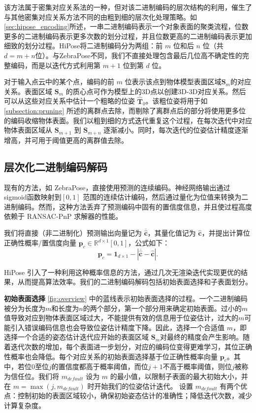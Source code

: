 该方法属于密集对应关系法的一种，但对该二进制编码的层次结构的利用，催生了与其他密集对应关系方法不同的由粗到细的层次化处理策略。如\autoref{sec:hipose_encoding}所述，一串二进制编码表示一个对象表面的聚类流程，位数更多的二进制编码表示更多次数的划分过程，并且位数更高的二进制编码表示更加细致的划分过程。HiPose将二进制编码分为两组：前 $m$ 位和后 $n$ 位（共$d=m+n$位）。与ZebraPose\cite{su2022zebrapose}不同，我们不直接处理包含最后几位高不确定性的完整编码，而是以迭代方式利用第 ${m+1}$ 位到第 $d$ 位。

对于输入点云中的某个点，编码的前 $m$ 位表示该点到物体模型表面区域$\mathbf{S}_{m}$的对应关系。表面区域 $\mathbf{S}_{m}$ 的质心点可作为模型上的3D点以创建3D-3D对应关系。然后可以从这些对应关系中估计一个粗略的位姿 $\hat{\mathbf{T}}_{0}$。该粗位姿将用于如\autoref{subsection:pruning} 所述的离群点去除，而剔除了离群点后的部分将使用更多位的编码收缩物体表面。我们以粗到细的方式迭代重复这个过程，在每次迭代中对应物体表面区域从 $\mathbf{S}_{m+1}$ 到 $\mathbf{S}_{m+n}$ 逐渐减小。同时，每次迭代的位姿估计精度逐渐增高，并可用于阈值更高的离群值去除。

\subsection{层次化二进制编码解码}
\label{subsection:solver}
现有的方法，如 ZebraPose\cite{su2022zebrapose}，直接使用预测的连续编码。神经网络输出通过sigmoid函数映射到$[0,1]$ 范围的连续估计编码，然后通过量化为位值来转换为二进制编码。然而，这种方法丢弃了预测编码中固有的置信度信息，并且使过程高度依赖于 RANSAC-PnP 求解器的性能。

我们将直接（非二进制化）预测输出向量记为 $\overline{\hat{\mathbf{c}}}$，其量化值记为 $\hat{\mathbf{c}}$，并提出计算位正确性概率/置信度向量 $\mathbf{p}_{c} \in \mathbb{R}^{d\times1}{[0,1]}$，公式如下： 
\begin{equation}
    \mathbf{p}_{c} = \mathbf{1}_{d\times1} - |\overline{\hat{\mathbf{c}}} - \hat{\mathbf{c}}|. 
\end{equation} 

HiPose 引入了一种利用这种概率信息的方法，通过几次无渲染迭代实现更优的结果，从而提高算法效率。我们的二进制编码解码包括初始表面选择和子表面划分。

\textbf{初始表面选择} \autoref{fig:overview} 中的蓝线表示初始表面选择的过程。一个二进制编码被分为长度为$m$和长度为$n$的两个部分，第一个部分用来确定初始表面。过小的$m$值导致对应到物体表面区域过大，不能提供有效的信息用于位姿估计，过大的$m$可能引入错误编码信息也会导致位姿估计精度下降。因此，选择一个合适值 $m$，即选择一个合适的姿态估计迭代应开始的表面区域 $\mathbf{S}_{m}$对最终的精度会产生影响。随着迭代次数的增加，每个表面进一步划分，对应的编码位变得更难学习，其位正确性概率也会降低。每个对应关系的初始表面选择基于位正确性概率向量 $\mathbf{p}_{c}$。其中，若位$0$至位$j$的置信度都高于概率阈值，而位$j+1$不高于概率阈值，则位$j$被称为信任位。我们将 $m_{default}$ 设为 $m$ 的最小值，以限制子表面的最大初始大小，并在 $m = \max(j, m_{default})$ 时开始我们的位姿估计迭代。
设置 $m_{default}$ 有两个优点：控制初始的表面区域较小，确保初始姿态估计的准确性；降低迭代次数，减少计算复杂度。

